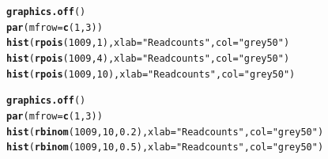 \documentclass{beamer}\usepackage[]{graphicx}\usepackage[]{color}
\makeatletter
\newcommand{\hlnum}[1]{\textcolor[rgb]{0.686,0.059,0.569}{#1}}%
\newcommand{\hlstr}[1]{\textcolor[rgb]{0.192,0.494,0.8}{#1}}%
\newcommand{\hlstd}[1]{\textcolor[rgb]{0.345,0.345,0.345}{#1}}%
\newcommand{\hlkwc}[1]{\textcolor[rgb]{0.333,0.667,0.333}{#1}}%
\newcommand{\hlkwd}[1]{\textcolor[rgb]{0.737,0.353,0.396}{\textbf{#1}}}%
\newenvironment{kframe}{%
 \def\at@end@of@kframe{}%
 \ifinner\ifhmode%
  \def\at@end@of@kframe{\end{minipage}}%
  \begin{minipage}{\columnwidth}%
 \fi\fi%
 \def\FrameCommand##1{\hskip\@totalleftmargin \hskip-\fboxsep
 \colorbox{shadecolor}{##1}\hskip-\fboxsep
     \hskip-\linewidth \hskip-\@totalleftmargin \hskip\columnwidth}%
 \MakeFramed {\advance\hsize-\width
   \@totalleftmargin\z@ \linewidth\hsize
   \@setminipage}}%
 {\par\unskip\endMakeFramed%
 \at@end@of@kframe}
\newenvironment{knitrout}{}{} %
\makeatother
\begin{document}
\begin{knitrout}
\color{fgcolor}\begin{kframe}
\begin{alltt}
\hlkwd{graphics.off}\hlstd{()}
\hlkwd{par}\hlstd{(}\hlkwc{mfrow}\hlstd{=}\hlkwd{c}\hlstd{(}\hlnum{1}\hlstd{,}\hlnum{3}\hlstd{))}
\hlkwd{hist}\hlstd{(}\hlkwd{rpois}\hlstd{(}\hlnum{1009}\hlstd{,} \hlnum{1}\hlstd{),} \hlkwc{xlab}\hlstd{=}\hlstr{"Read counts"}\hlstd{,} \hlkwc{col} \hlstd{=} \hlstr{"grey50"}\hlstd{)}
\hlkwd{hist}\hlstd{(}\hlkwd{rpois}\hlstd{(}\hlnum{1009}\hlstd{,} \hlnum{4}\hlstd{),} \hlkwc{xlab}\hlstd{=}\hlstr{"Read counts"}\hlstd{,} \hlkwc{col} \hlstd{=} \hlstr{"grey50"}\hlstd{)}
\hlkwd{hist}\hlstd{(}\hlkwd{rpois}\hlstd{(}\hlnum{1009}\hlstd{,} \hlnum{10}\hlstd{),} \hlkwc{xlab}\hlstd{=}\hlstr{"Read counts"}\hlstd{,} \hlkwc{col} \hlstd{=} \hlstr{"grey50"}\hlstd{)}


\hlkwd{graphics.off}\hlstd{()}
\hlkwd{par}\hlstd{(}\hlkwc{mfrow}\hlstd{=}\hlkwd{c}\hlstd{(}\hlnum{1}\hlstd{,}\hlnum{3}\hlstd{))}
\hlkwd{hist}\hlstd{(}\hlkwd{rbinom}\hlstd{(}\hlnum{1009}\hlstd{,} \hlnum{10}\hlstd{,} \hlnum{0.2}\hlstd{),} \hlkwc{xlab}\hlstd{=}\hlstr{"Read counts"}\hlstd{,} \hlkwc{col} \hlstd{=} \hlstr{"grey50"}\hlstd{)}
\hlkwd{hist}\hlstd{(}\hlkwd{rbinom}\hlstd{(}\hlnum{1009}\hlstd{,} \hlnum{10}\hlstd{,} \hlnum{0.5}\hlstd{),} \hlkwc{xlab}\hlstd{=}\hlstr{"Read counts"}\hlstd{,} \hlkwc{col} \hlstd{=} \hlstr{"grey50"}\hlstd{)}
\end{alltt}
\end{kframe}
\end{knitrout}
\end{document}

